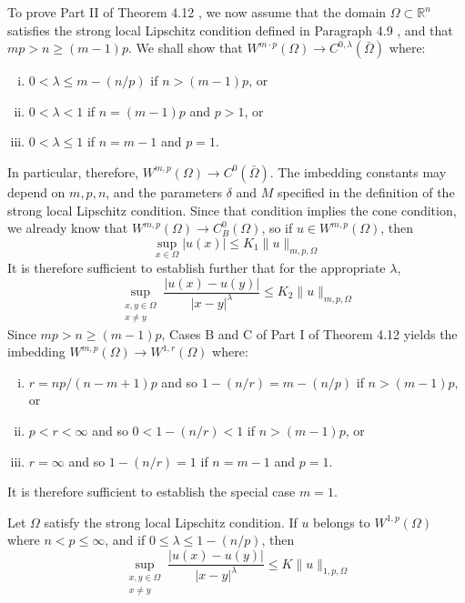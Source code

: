 \begin{para}
  To prove Part II of Theorem 4.12 , we now assume that the domain $\Omega \subset \mathbb{R}^n$ satisfies the strong local Lipschitz condition defined in Paragraph 4.9 , and that $m p>n \geq(m-1) p$. We shall show that $W^{m \cdot p}(\Omega) \rightarrow C^{0, \lambda}(\bar{\Omega})$ where:
  \begin{enumerate}[(i)]
    \item $0<\lambda \leq m-(n / p)$ if $n>(m-1) p$, or
    \item $0<\lambda<1$ if $n=(m-1) p$ and $p>1$, or
    \item $0<\lambda \leq 1$ if $n=m-1$ and $p=1$.
  \end{enumerate}
  In particular, therefore, $W^{m, p}(\Omega) \rightarrow C^0(\bar{\Omega})$. The imbedding constants may depend on $m, p, n$, and the parameters $\delta$ and $M$ specified in the definition of the strong local Lipschitz condition. Since that condition implies the cone condition, we already know that $W^{m, p}(\Omega) \rightarrow C_B^0(\Omega)$, so if $u \in W^{m, p}(\Omega)$, then
  \[
  \sup _{x \in \Omega}|u(x)| \leq K_1\|u\|_{m, p, \Omega}
  \]
  It is therefore sufficient to establish further that for the appropriate $\lambda$,
  \[
  \sup _{\substack{x, y \in \Omega \\ x \neq y}} \frac{|u(x)-u(y)|}{|x-y|^\lambda} \leq K_2\|u\|_{m, p, \Omega}
  \]
  Since $m p>n \geq(m-1) p$, Cases $\mathrm{B}$ and $\mathrm{C}$ of Part I of Theorem 4.12 yields the imbedding $W^{m, p}(\Omega) \rightarrow W^{1, r}(\Omega)$ where:
  \begin{enumerate}[(i)]
    \item $r=n p /(n-m+1) p$ and so $1-(n / r)=m-(n / p)$ if $n>(m-1) p$, or
    \item $p<r<\infty$ and so $0<1-(n / r)<1$ if $n>(m-1) p$, or
    \item $r=\infty$ and so $1-(n / r)=1$ if $n=m-1$ and $p=1$.
  \end{enumerate}
  It is therefore sufficient to establish the special case $m=1$.
\end{para}


\begin{lemma}
  Let $\Omega$ satisfy the strong local Lipschitz condition. If $u$ belongs to $W^{1, p}(\Omega)$ where $n<p \leq \infty$, and if $0 \leq \lambda \leq 1-(n / p)$, then
  \[
  \sup _{\substack{x, y \in \Omega \\ x \neq y}} \frac{|u(x)-u(y)|}{|x-y|^\lambda} \leq K\|u\|_{1, p, \Omega}
  \]
\end{lemma}

